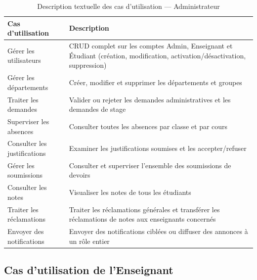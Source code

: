 \begin{table}[H]
\centering
\caption{Description textuelle des cas d'utilisation — Administrateur}
\label{tab:uc_admin}
\begin{tabularx}{\textwidth}{lX}
\toprule
\textbf{Cas d'utilisation} & \textbf{Description} \\
\midrule
Gérer les utilisateurs & CRUD complet sur les comptes Admin, Enseignant et Étudiant (création, modification, activation/désactivation, suppression) \\
Gérer les départements & Créer, modifier et supprimer les départements et groupes \\
Traiter les demandes & Valider ou rejeter les demandes administratives et les demandes de stage \\
Superviser les absences & Consulter toutes les absences par classe et par cours \\
Consulter les justifications & Examiner les justifications soumises et les accepter/refuser \\
Gérer les soumissions & Consulter et superviser l'ensemble des soumissions de devoirs \\
Consulter les notes & Visualiser les notes de tous les étudiants \\
Traiter les réclamations & Traiter les réclamations générales et transférer les réclamations de notes aux enseignants concernés \\
Envoyer des notifications & Envoyer des notifications ciblées ou diffuser des annonces à un rôle entier \\
\bottomrule
\end{tabularx}
\end{table}

\subsection{Cas d'utilisation de l'Enseignant}


